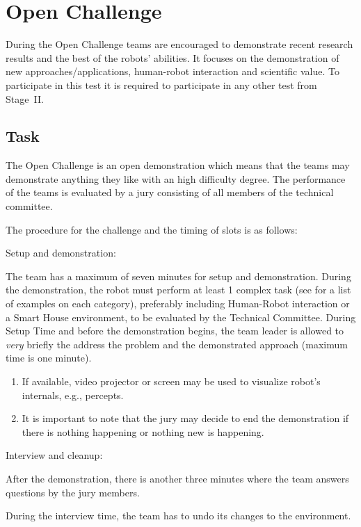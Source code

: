 \section{Open Challenge}

During the Open Challenge teams are encouraged to demonstrate recent research results and the best of the robots' abilities. It focuses on the demonstration of new approaches/applications, human-robot interaction and scientific value. To participate in this test it is required to participate in any other test from Stage~II.

\subsection{Task}

The Open Challenge is an open demonstration which means that the teams may demonstrate anything they like with an high difficulty degree. The performance of the teams is evaluated by a jury consisting of all members of the technical committee.

The procedure for the challenge and the timing of slots is as follows:
\begin{enumerate}
  {\bf\item Setup and demonstration:} The team has a maximum of seven minutes for setup and demonstration. During the demonstration, the robot must perform at least 1 complex task (see for a list of examples on each category), preferably including Human-Robot interaction or a Smart House environment, to be evaluated by the Technical Committee. During Setup Time and before the demonstration begins, the team leader is allowed to \emph{very} briefly the address the problem and the demonstrated approach (maximum time is one minute).

	\begin{enumerate}
		\item If available, video projector or screen may be used to visualize robot's internals, e.g., percepts.
		\item It is important to note that the jury may decide to end the demonstration if there is nothing happening or nothing new is happening.
	\end{enumerate}
  {\bf\item Interview and cleanup:} After the demonstration, there is another three minutes where the team answers questions by the jury members.

  During the interview time, the team has to undo its changes to the environment.
\end{enumerate}

